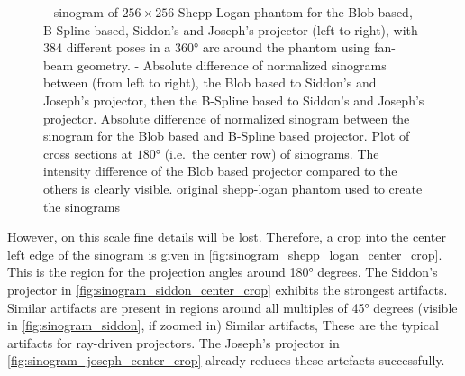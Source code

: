 \begin{figure}[H]
	\caption{-- sinogram of \(256 \times
		256\) Shepp-Logan phantom for the Blob based, B-Spline based, Siddon's and Joseph's
		projector (left to right), with \(384\) different poses in a \(360\)° arc around the
		phantom using fan-beam geometry.%
		- Absolute
		difference of normalized sinograms between (from left to right), the Blob based to
		Siddon's and Joseph's projector, then the B-Spline based to Siddon's and Joseph's
		projector.  Absolute difference of normalized
		sinogram between the sinogram for the Blob based and B-Spline based projector.%
		 Plot of cross sections at \(180\)° (i.e.\ the
		center row) of sinograms. The intensity difference of the Blob based projector
		compared to the others is clearly visible.  original
		shepp-logan phantom used to create the sinograms}%
	\label{fig:sinogram_shepp_logan}
\end{figure}

However, on this scale fine details will be lost. Therefore, a crop into the center left edge of the
sinogram is given in \autoref{fig:sinogram_shepp_logan_center_crop}. This is the region for the
projection angles around 180° degrees. The Siddon's projector in
\autoref{fig:sinogram_siddon_center_crop} exhibits the strongest artifacts. Similar artifacts are
present in regions around all multiples of 45° degrees (visible in \autoref{fig:sinogram_siddon}, if
zoomed in) Similar artifacts, These are the typical artifacts for ray-driven projectors. The
Joseph's projector in \autoref{fig:sinogram_joseph_center_crop} already reduces these artefacts
successfully.

